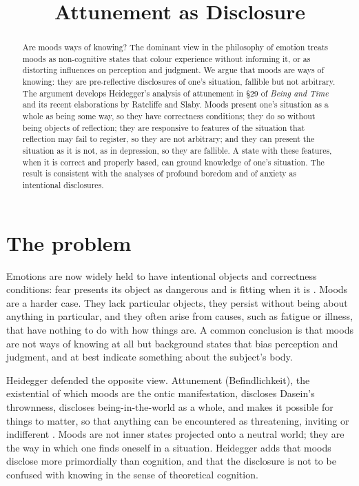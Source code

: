 \documentclass{situationist-preprint}
\title{Attunement as Disclosure}
\begin{document}
\maketitle

\begin{abstract}
Are moods ways of knowing? The dominant view in the philosophy of emotion treats moods as non-cognitive states that colour experience without informing it, or as distorting influences on perception and judgment. We argue that moods are ways of knowing: they are pre-reflective disclosures of one's situation, fallible but not arbitrary. The argument develops Heidegger's analysis of attunement in \S 29 of \emph{Being and Time} and its recent elaborations by Ratcliffe and Slaby. Moods present one's situation as a whole as being some way, so they have correctness conditions; they do so without being objects of reflection; they are responsive to features of the situation that reflection may fail to register, so they are not arbitrary; and they can present the situation as it is not, as in depression, so they are fallible. A state with these features, when it is correct and properly based, can ground knowledge of one's situation. The result is consistent with the analyses of profound boredom and of anxiety as intentional disclosures.
\end{abstract}

\section{The problem}

Emotions are now widely held to have intentional objects and correctness conditions: fear presents its object as dangerous and is fitting when it is \citep{Goldie2000, DeonnaTeroni2012, Tappolet2016}. Moods are a harder case. They lack particular objects, they persist without being about anything in particular, and they often arise from causes, such as fatigue or illness, that have nothing to do with how things are. A common conclusion is that moods are not ways of knowing at all but background states that bias perception and judgment, and at best indicate something about the subject's body.

Heidegger defended the opposite view. Attunement (Befindlichkeit), the existential of which moods are the ontic manifestation, discloses Dasein's thrownness, discloses being-in-the-world as a whole, and makes it possible for things to matter, so that anything can be encountered as threatening, inviting or indifferent \citep[\S 29]{Heidegger1927}. Moods are not inner states projected onto a neutral world; they are the way in which one finds oneself in a situation. Heidegger adds that moods disclose more primordially than cognition, and that the disclosure is not to be confused with knowing in the sense of theoretical cognition.
\end{document}
